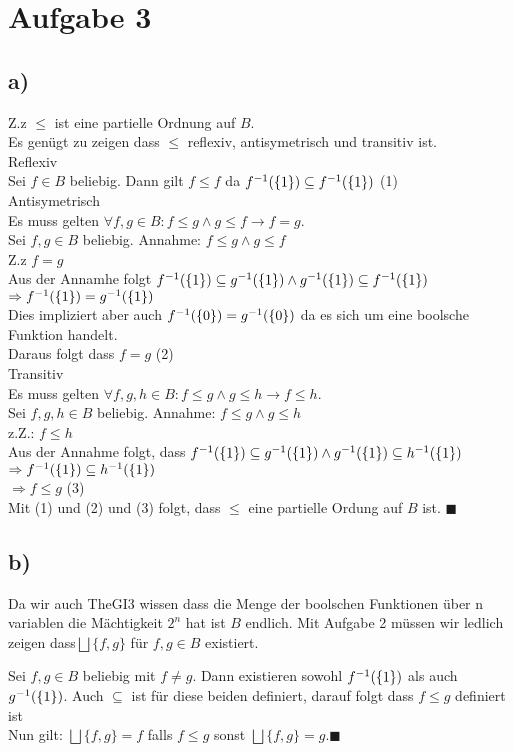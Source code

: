 \section*{Aufgabe 3}
\subsection*{a)}

Z.z $\leq$ ist eine partielle Ordnung auf $B$.\\
Es genügt zu zeigen dass $\leq$ reflexiv, antisymetrisch und transitiv ist.\\

Reflexiv\\
Sei $f \in B$ beliebig. Dann gilt $f \leq f$ da $f^{-1}(\{1\}) \subseteq f^{-1}(\{1\})$ (1)\\

Antisymetrisch \\
Es muss gelten $\forall f,g \in B : f \leq g \land g \leq f \rightarrow f =g$.\\
Sei $f,g \in B$ beliebig. 
Annahme: $f \leq g \land g \leq f $ \\
Z.z $f =g$\\
Aus der Annamhe folgt $f^{-1}(\{1\}) \subseteq g^{-1}(\{1\}) \land g^{-1}(\{1\}) \subseteq f^{-1}(\{1\}) $\\
 $\Rightarrow f^{-1}(\{1\}) = g^{-1}(\{1\})$\\
Dies impliziert aber auch $f^{-1}(\{0\}) = g^{-1}(\{0\})$ da es sich um eine boolsche Funktion handelt.\\
Daraus folgt dass $f=g$ (2)\\

Transitiv\\
Es muss gelten $\forall f,g,h \in B : f \leq g \land g \leq h \rightarrow f \leq h$.\\
Sei $f,g,h \in B$ beliebig. 
Annahme: $f \leq g \land g \leq h$\\
z.Z.: $f \leq h$\\
Aus der Annahme folgt, dass  $f^{-1}(\{1\}) \subseteq g^{-1}(\{1\}) \land g^{-1}(\{1\}) \subseteq h^{-1}(\{1\})$\\
$\Rightarrow f^{-1}(\{1\}) \subseteq h^{-1}(\{1\})$\\
$\Rightarrow f \leq g$ (3)\\

Mit (1) und (2) und (3) folgt, dass $\leq$ eine partielle Ordung auf $B$ ist. $\blacksquare$

\subsection*{b)}
Da wir auch TheGI3 wissen dass die Menge der boolschen Funktionen über n variablen die Mächtigkeit $2^n$ hat ist $B$ endlich.
Mit Aufgabe 2 müssen wir ledlich zeigen dass$ \bigsqcup \{f,g\}$ für $f,g \in B$ existiert.

Sei $f,g \in B$ beliebig mit $f \neq g$. 
Dann existieren sowohl $f^{-1}(\{1\})$ als auch $g^{-1}(\{1\})$. Auch $\subseteq$ ist für diese beiden definiert, darauf folgt dass $f \leq g$ definiert ist\\
Nun gilt:
$ \bigsqcup \{f,g\}= f$ falls $f \leq g$ sonst 
$ \bigsqcup \{f,g\}= g$.$\blacksquare$


